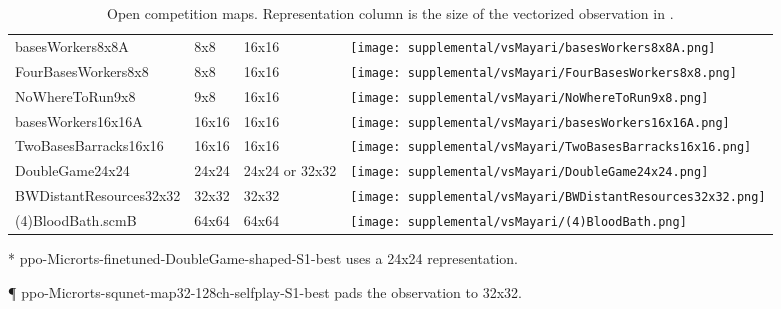 \documentclass{article}
\begin{document}
\begin{table}[H]
    \centering
    \begin{threeparttable}
        \caption{Open competition maps. Representation column is the size of the vectorized observation in \agentName.}
        \label{tab:open-maps}
            \begin{tabular}{>{\centering\arraybackslash}m{4cm}>{\centering\arraybackslash}m{2cm}>{\centering\arraybackslash}m{2cm}>{\centering\arraybackslash}m{2.25cm}}
                \multicolumn{1}{c}{\bf Name}  &\multicolumn{1}{c}{\bf Size}
                &\multicolumn{1}{c}{\bf Representation}
                &\multicolumn{1}{c}{\bf Start} \\ \hline
                basesWorkers8x8A & 8x8 & 16x16 &
                \texttt{[image: supplemental/vsMayari/basesWorkers8x8A.png]} \\
                FourBasesWorkers8x8 & 8x8 & 16x16 &
                \texttt{[image: supplemental/vsMayari/FourBasesWorkers8x8.png]} \\
                NoWhereToRun9x8 & 9x8 & 16x16 &
                \texttt{[image: supplemental/vsMayari/NoWhereToRun9x8.png]} \\
                basesWorkers16x16A & 16x16 & 16x16 &
                \texttt{[image: supplemental/vsMayari/basesWorkers16x16A.png]} \\
                TwoBasesBarracks16x16 & 16x16 & 16x16 &
                \texttt{[image: supplemental/vsMayari/TwoBasesBarracks16x16.png]}
                \\
                DoubleGame24x24 & 24x24 & 24x24\tnote{*} or 32x32\tnote{\P} &
                \texttt{[image: supplemental/vsMayari/DoubleGame24x24.png]} \\
                BWDistantResources32x32 & 32x32 & 32x32 &
                \texttt{[image: supplemental/vsMayari/BWDistantResources32x32.png]}
                \\
                (4)BloodBath.scmB & 64x64 & 64x64 &
                \texttt{[image: supplemental/vsMayari/(4)BloodBath.png]} \\
            \end{tabular}
            \begin{tablenotes}
                \item[*] ppo-Microrts-finetuned-DoubleGame-shaped-S1-best uses a 24x24
                    representation.
                \item[\P] ppo-Microrts-squnet-map32-128ch-selfplay-S1-best pads the
                    observation to 32x32.
            \end{tablenotes}
    \end{threeparttable}
\end{table}
\end{document}
